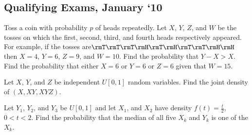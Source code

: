 \subsection{Qualifying Exams, January `10}
\begin{problem}
  Toss a coin with probability \(p\) of heads repeatedly. Let \(X\), \(Y\),
  \(Z\), and \(W\) be the tosses on which the first, second, third, and
  fourth heads respectively appeared. For example, if the tosses
  are\(\rmT\rmT\rmT\rmH\rmT\rmH\rmT\rmT\rmH\rmH\) then \(X=4\), \(Y=6\),
  \(Z=9\), and \(W=10\). Find the probability that \(Y-X>X\). Find the
  probability that either \(X=6\) or \(Y=6\) or \(Z=6\) given that
  \(W=15\).
\end{problem}
\begin{solution*}
\end{solution*}

\begin{problem}
  Let \(X\), \(Y\), and \(Z\) be independent \(U[0,1]\) random
  variables. Find the joint density of \((X,XY,XYZ)\).
\end{problem}
\begin{solution*}
\end{solution*}

\begin{problem}
  Let \(Y_1\), \(Y_2\), and \(Y_3\) be \(U[0,1]\) and let \(X_1\), and
  \(X_2\) have density \(f(t)=\frac{t}{2}\), \(0<t<2\). Find the
  probability that the median of all five \(X_k\) and \(Y_k\) is one of the
  \(X_k\).
\end{problem}
\begin{solution*}
\end{solution*}

\begin{problem}
\end{problem}
\begin{solution*}
\end{solution*}

\begin{problem}
\end{problem}
\begin{solution*}
\end{solution*}

\begin{problem}
\end{problem}
\begin{solution*}
\end{solution*}

